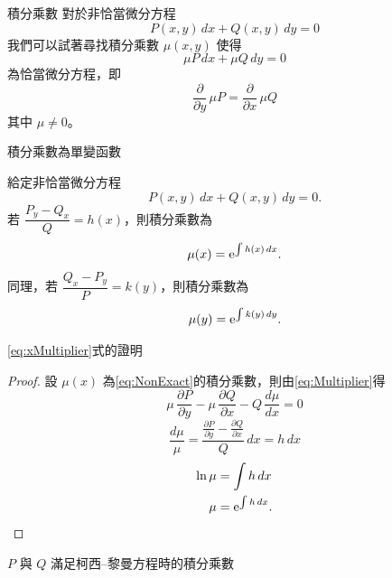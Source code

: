 \documentclass{beamer}
\newcommand  {\e}{\textup e}
\theoremstyle{remark}
\begin{document}
\begin{CJK}{UTF8}{bsmi}
\begin{frame}{積分乘數}
  對於非恰當微分方程
  \[P(x,y)\,dx + Q(x,y)\,dy = 0\]
  我們可以試著尋找積分乘數 $\mu(x,y)$ 使得
  \[\mu P\,dx + \mu Q\,dy = 0\]
  為恰當微分方程，即
  \begin{equation}
    \frac{\partial}{\partial y}\,\mu P = \frac{\partial}{\partial x}\,\mu Q \label{eq:Multiplier}
  \end{equation}
  其中 $\mu \ne 0$。
\end{frame}

\begin{frame}{積分乘數為單變函數}
  \begin{theorem}
    給定非恰當微分方程
    \begin{equation}
      P(x,y)\,dx + Q(x,y)\,dy = 0. \label{eq:NonExact}
    \end{equation}
    若 $\dfrac{P_y - Q_x}{Q} = h(x)$，則積分乘數為
    \begin{equation}
      \mu(x) = \e^{\int h(x)\,dx}. \label{eq:xMultiplier}
    \end{equation}
    同理，若 $\dfrac{Q_x - P_y}{P} = k(y)$，則積分乘數為
    \[\mu(y) = \e^{\int k(y)\,dy}.\]
  \end{theorem}
\end{frame}

\begin{frame}{\eqref{eq:xMultiplier}式的證明}
  \begin{proof}
    設 $\mu(x)$ 為\eqref{eq:NonExact}的積分乘數，則由\eqref{eq:Multiplier}得
    \[\mu\,\frac{\partial P}{\partial y} - \mu\,\frac{\partial Q}{\partial x} - Q\,\frac{d\mu}{dx} = 0\]
    \[\frac{d\mu}{\mu} = \frac{\frac{\partial P}{\partial y} - \frac{\partial Q}{\partial x}}{Q}\,dx = h\,dx\]
    \begin{align*}
      \ln \mu &= \int h\,dx\\
      \mu &= \e^{\int h\,dx}. \qedhere
    \end{align*}
  \end{proof}
\end{frame}

\begin{frame}{$P$ 與 $Q$ 滿足柯西--黎曼方程時的積分乘數}
\end{frame}


\end{CJK}
\end{document}
